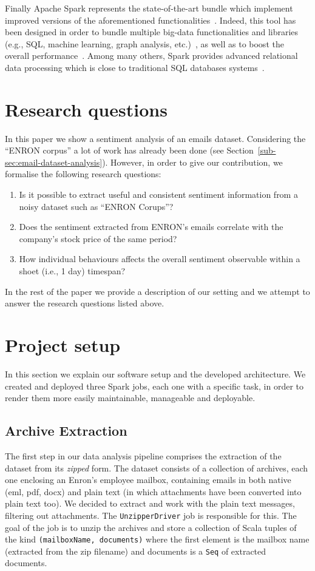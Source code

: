 \documentclass{vldb}
\begin{document}
Finally Apache Spark represents the state-of-the-art bundle which implement improved versions of the aforementioned functionalities~\cite{shoro2015big}.
Indeed, this tool has been designed in order to bundle multiple big-data functionalities and libraries (e.g., SQL, machine learning, graph analysis, etc.)~\cite{meng2015mllib}, as well as to boost the overall performance~\cite{gopalani2015comparing}.
Among many others, Spark provides advanced relational data processing which is close to traditional SQL databases systems~\cite{armbrust2015spark}. 


\section{Research questions}
\label{sec:r-q}
In this paper we show a sentiment analysis of an emails dataset.
Considering the ``ENRON corpus'' a lot of work has already been done (see Section~\ref{sub-sec:email-dataset-analysis}).
However, in order to give our contribution, we formalise the following research questions:
\begin{enumerate}
	\item Is it possible to extract useful and consistent sentiment information from a noisy dataset such as ``ENRON Corups''?
	\item Does the sentiment extracted from ENRON's emails correlate with the company's stock price of the same period?
	\item How individual behaviours affects the overall sentiment observable within a shoet (i.e., 1 day) timespan?
\end{enumerate}

In the rest of the paper we provide a description of our setting and we attempt to answer the research questions listed above.


\section{Project setup}
\label{sec:p-s}
In this section we explain our software setup and the developed architecture.
We created and deployed three Spark jobs, each one with a specific task, in
order to render them more easily maintainable, manageable and deployable.

\subsection{Archive Extraction}
\label{sub-sec:archive-extraction}
The first step in our data analysis pipeline comprises the extraction of the
dataset from its \textit{zipped} form. The dataset consists of a collection of
archives, each one enclosing an Enron's employee mailbox, containing emails in
both native (eml, pdf, docx) and plain text (in which attachments have been
converted into plain text too). We decided to extract and work with the plain
text messages, filtering out attachments. The \texttt{UnzipperDriver} job is
responsible for this. The goal of the job is to unzip the archives and store a
collection of Scala tuples of the kind \texttt{(mailboxName, documents)} where
the first element is the mailbox name (extracted from the zip filename) and
documents is a \texttt{Seq} of extracted documents.
\end{document}

